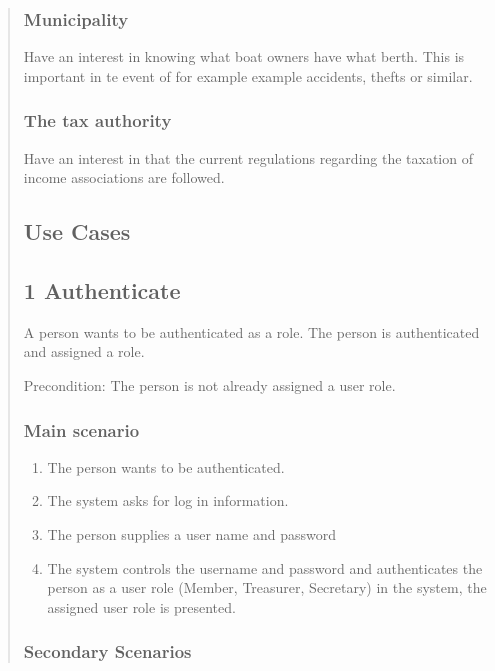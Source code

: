 \begin{quote}
\subsubsection{Municipality}\label{municipality}

Have an interest in knowing what boat owners have what berth. This is
important in te event of for example example accidents, thefts or
similar.

\subsubsection{The tax authority}\label{the-tax-authority}

Have an interest in that the current regulations regarding the taxation
of income associations are followed.

\subsection{Use Cases}\label{use-cases}

\subsection{1 Authenticate}\label{authenticate}

A person wants to be authenticated as a role. The person is
authenticated and assigned a role.

Precondition: The person is not already assigned a user role.

\subsubsection{Main scenario}\label{main-scenario}

\begin{enumerate}
\tightlist
\item
  The person wants to be authenticated.
\item
  The system asks for log in information.
\item
  The person supplies a user name and password
\item
  The system controls the username and password and authenticates the
  person as a user role (Member, Treasurer, Secretary) in the system,
  the assigned user role is presented.
\end{enumerate}

\subsubsection{Secondary Scenarios}\label{secondary-scenarios}


\end{quote}
